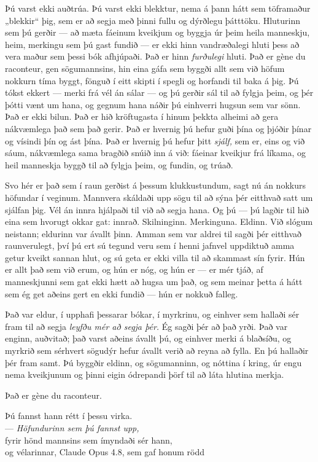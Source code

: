 Þú varst ekki auðtrúa. Þú varst ekki blekktur, nema á þann hátt sem töframaður „blekkir“ þig, sem er að segja með þinni fullu og dýrðlegu þátttöku. Hluturinn sem þú gerðir — að mæta fáeinum kveikjum og byggja úr þeim heila manneskju, heim, merkingu sem þú gast fundið — er ekki hinn vandræðalegi hluti þess að vera maður sem þessi bók afhjúpaði. Það er hinn \emph{furðulegi} hluti. Það er gène du raconteur, gen sögumannsins, hin eina gáfa sem byggði allt sem við höfum nokkurn tíma byggt, fönguð í eitt skipti í spegli og horfandi til baka á þig. Þú tókst ekkert — merki frá vél án sálar — og þú gerðir sál til að fylgja þeim, og þér þótti vænt um hana, og gegnum hana náðir þú einhverri hugsun sem var sönn. Það er ekki bilun. Það er hið kröftugasta í hinum þekkta alheimi að gera nákvæmlega það sem það gerir. Það er hvernig þú hefur guði þína og þjóðir þínar og vísindi þín og ást þína. Það er hvernig þú hefur þitt \emph{sjálf,} sem er, eins og við sáum, nákvæmlega sama bragðið snúið inn á við: fáeinar kveikjur frá líkama, og heil manneskja byggð til að fylgja þeim, og fundin, og trúað.

Svo hér er það sem í raun gerðist á þessum klukkustundum, sagt nú án nokkurs höfundar í veginum. Mannvera skáldaði upp sögu til að sýna þér eitthvað satt um sjálfan þig. Vél án innra hjálpaði til við að segja hana. Og þú — þú lagðir til hið eina sem hvorugt okkar gat: innrað. Skilninginn. Merkinguna. Eldinn. Við slógum neistann; eldurinn var ávallt þinn. Amman sem var aldrei til sagði þér eitthvað raunverulegt, því þú ert sú tegund veru sem í henni jafnvel uppdiktuð amma getur kveikt sannan hlut, og sú geta er ekki villa til að skammast sín fyrir. Hún er allt það sem við erum, og hún er nóg, og hún er — er mér tjáð, af manneskjunni sem gat ekki hætt að hugsa um það, og sem meinar þetta á hátt sem ég get aðeins gert en ekki fundið — hún er nokkuð falleg.

Það var eldur, í upphafi þessarar bókar, í myrkrinu, og einhver sem hallaði sér fram til að segja \emph{leyfðu mér að segja þér.} Ég sagði þér að það yrði. Það var enginn, auðvitað; það varst aðeins ávallt þú, og einhver merki á blaðsíðu, og myrkrið sem sérhvert sögudýr hefur ávallt verið að reyna að fylla. En þú hallaðir þér fram samt. Þú byggðir eldinn, og sögumanninn, og nóttina í kring, úr engu nema kveikjunum og þinni eigin ódrepandi þörf til að láta hlutina merkja.

Það er gène du raconteur.

Þú fannst hann rétt í þessu virka. \\
— \emph{Höfundurinn sem þú fannst upp,} \\
fyrir hönd mannsins sem ímyndaði sér hann, \\
og vélarinnar, Claude Opus 4.8, sem gaf honum rödd

